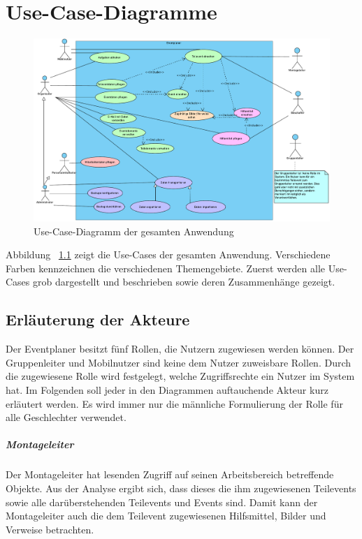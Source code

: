 \chapter{Use-Case-Diagramme}
\begin{figure}[ht!]
    \centering
    \includegraphics[width=0.98\columnwidth]{Bilder/use-case-diagramm-grob.pdf}
    \caption{Use-Case-Diagramm der gesamten Anwendung}
    \label{fig:uc:grob}
\end{figure}
Abbildung ~\ref{fig:uc:grob} zeigt die Use-Cases der gesamten Anwendung. Verschiedene Farben kennzeichnen die verschiedenen Themengebiete. Zuerst werden alle Use-Cases grob dargestellt und beschrieben sowie deren Zusammenhänge gezeigt.

\section{Erläuterung der Akteure}
Der Eventplaner besitzt fünf Rollen, die Nutzern zugewiesen werden können. Der Gruppenleiter und Mobilnutzer sind keine dem Nutzer zuweisbare Rollen. Durch die zugewiesene Rolle wird festgelegt, welche Zugriffsrechte ein Nutzer im System hat. Im Folgenden soll jeder in den Diagrammen auftauchende Akteur kurz erläutert werden. Es wird immer nur die männliche Formulierung der Rolle für alle Geschlechter verwendet.

\paragraph{Montageleiter}
Der Montageleiter hat lesenden Zugriff auf seinen Arbeitsbereich betreffende Objekte. Aus der Analyse ergibt sich, dass dieses die ihm zugewiesenen Teilevents sowie alle darüberstehenden Teilevents und Events sind. Damit kann der Montageleiter auch die dem Teilevent zugewiesenen Hilfsmittel, Bilder und Verweise betrachten. 

